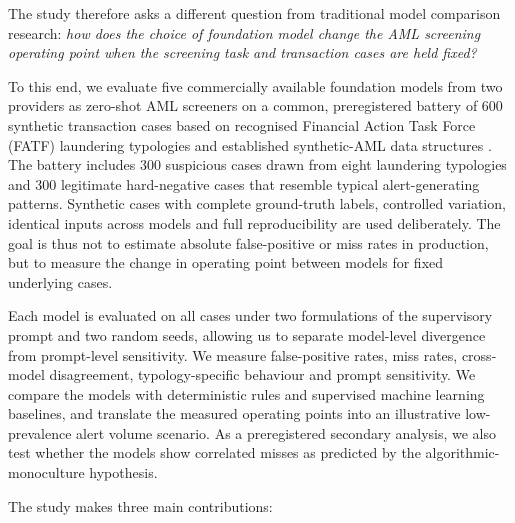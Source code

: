 \documentclass[pdflatex,sn-basic,Numbered]{sn-jnl}
\begin{document}
The study therefore asks a different question from traditional model comparison research: \emph{how does the choice of foundation model change the AML screening operating point when the screening task and transaction cases are held fixed?}

To this end, we evaluate five commercially available foundation models from two providers as zero-shot AML screeners on a common, preregistered battery of 600 synthetic transaction cases based on recognised Financial Action Task Force (FATF) laundering typologies and established synthetic-AML data structures \cite{samld,weber2018}. The battery includes 300 suspicious cases drawn from eight laundering typologies and 300 legitimate hard-negative cases that resemble typical alert-generating patterns. Synthetic cases with complete ground-truth labels, controlled variation, identical inputs across models and full reproducibility are used deliberately. The goal is thus not to estimate absolute false-positive or miss rates in production, but to measure the change in operating point between models for fixed underlying cases.

Each model is evaluated on all cases under two formulations of the supervisory prompt and two random seeds, allowing us to separate model-level divergence from prompt-level sensitivity. We measure false-positive rates, miss rates, cross-model disagreement, typology-specific behaviour and prompt sensitivity. We compare the models with deterministic rules and supervised machine learning baselines, and translate the measured operating points into an illustrative low-prevalence alert volume scenario. As a preregistered secondary analysis, we also test whether the models show correlated misses as predicted by the algorithmic-monoculture hypothesis.

The study makes three main contributions:
\end{document}

